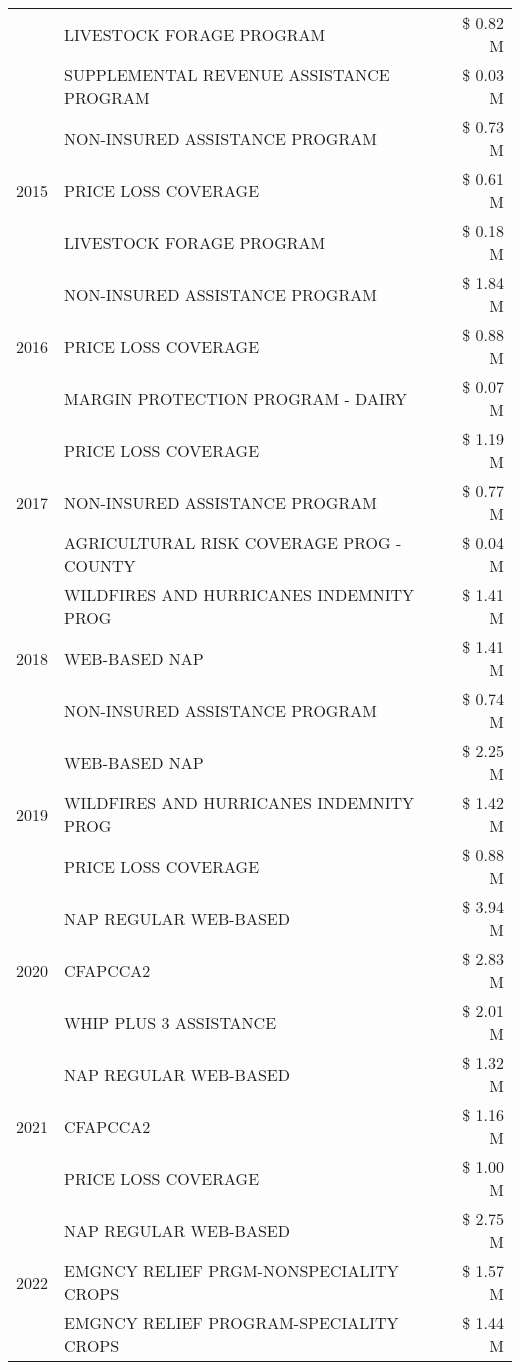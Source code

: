 \begin{tabular}{llr}
 & LIVESTOCK FORAGE PROGRAM & \$ 0.82 M \\
 & SUPPLEMENTAL REVENUE ASSISTANCE PROGRAM & \$ 0.03 M \\
\cline{1-3}
\multirow[t]{3}{*}{2015} & NON-INSURED ASSISTANCE PROGRAM & \$ 0.73 M \\
 & PRICE LOSS COVERAGE & \$ 0.61 M \\
 & LIVESTOCK FORAGE PROGRAM & \$ 0.18 M \\
\cline{1-3}
\multirow[t]{3}{*}{2016} & NON-INSURED ASSISTANCE PROGRAM & \$ 1.84 M \\
 & PRICE LOSS COVERAGE & \$ 0.88 M \\
 & MARGIN PROTECTION PROGRAM - DAIRY & \$ 0.07 M \\
\cline{1-3}
\multirow[t]{3}{*}{2017} & PRICE LOSS COVERAGE & \$ 1.19 M \\
 & NON-INSURED ASSISTANCE PROGRAM & \$ 0.77 M \\
 & AGRICULTURAL RISK COVERAGE PROG - COUNTY & \$ 0.04 M \\
\cline{1-3}
\multirow[t]{3}{*}{2018} & WILDFIRES AND HURRICANES INDEMNITY PROG & \$ 1.41 M \\
 & WEB-BASED NAP & \$ 1.41 M \\
 & NON-INSURED ASSISTANCE PROGRAM & \$ 0.74 M \\
\cline{1-3}
\multirow[t]{3}{*}{2019} & WEB-BASED NAP & \$ 2.25 M \\
 & WILDFIRES AND HURRICANES INDEMNITY PROG & \$ 1.42 M \\
 & PRICE LOSS COVERAGE & \$ 0.88 M \\
\cline{1-3}
\multirow[t]{3}{*}{2020} & NAP REGULAR WEB-BASED & \$ 3.94 M \\
 & CFAPCCA2 & \$ 2.83 M \\
 & WHIP PLUS 3 ASSISTANCE & \$ 2.01 M \\
\cline{1-3}
\multirow[t]{3}{*}{2021} & NAP REGULAR WEB-BASED & \$ 1.32 M \\
 & CFAPCCA2 & \$ 1.16 M \\
 & PRICE LOSS COVERAGE & \$ 1.00 M \\
\cline{1-3}
\multirow[t]{3}{*}{2022} & NAP REGULAR WEB-BASED & \$ 2.75 M \\
 & EMGNCY RELIEF PRGM-NONSPECIALITY CROPS & \$ 1.57 M \\
 & EMGNCY RELIEF PROGRAM-SPECIALITY CROPS & \$ 1.44 M \\
\cline{1-3}
\bottomrule
\end{tabular}
